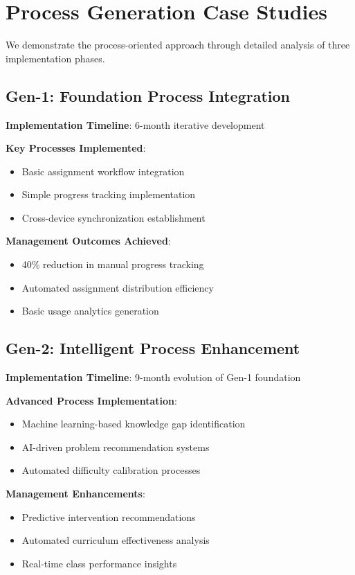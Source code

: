\documentclass[conference]{IEEEtran}
\begin{document}
\section{Process Generation Case Studies}

We demonstrate the process-oriented approach through detailed analysis of three implementation phases.

\subsection{Gen-1: Foundation Process Integration}

\textbf{Implementation Timeline}: 6-month iterative development

\textbf{Key Processes Implemented}:
\begin{itemize}
    \item Basic assignment workflow integration
    \item Simple progress tracking implementation
    \item Cross-device synchronization establishment
\end{itemize}

\textbf{Management Outcomes Achieved}:
\begin{itemize}
    \item 40\% reduction in manual progress tracking
    \item Automated assignment distribution efficiency
    \item Basic usage analytics generation
\end{itemize}

\subsection{Gen-2: Intelligent Process Enhancement}

\textbf{Implementation Timeline}: 9-month evolution of Gen-1 foundation

\textbf{Advanced Process Implementation}:
\begin{itemize}
    \item Machine learning-based knowledge gap identification
    \item AI-driven problem recommendation systems
    \item Automated difficulty calibration processes
\end{itemize}

\textbf{Management Enhancements}:
\begin{itemize}
    \item Predictive intervention recommendations
    \item Automated curriculum effectiveness analysis
    \item Real-time class performance insights
\end{itemize}
\end{document}

